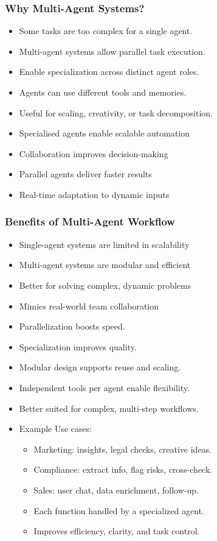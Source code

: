 \begin{frame}[fragile]\frametitle{Why Multi-Agent Systems?}
    \begin{itemize}
		\item Some tasks are too complex for a single agent.
		\item Multi-agent systems allow parallel task execution.
		\item Enable specialization across distinct agent roles.
		\item Agents can use different tools and memories.
		\item Useful for scaling, creativity, or task decomposition.	
        \item Specialised agents enable scalable automation
        \item Collaboration improves decision-making
        \item Parallel agents deliver faster results
        \item Real-time adaptation to dynamic inputs
    \end{itemize}
\end{frame}

\begin{frame}[fragile]\frametitle{Benefits of Multi-Agent Workflow}
    \begin{itemize}
        \item Single-agent systems are limited in scalability
        \item Multi-agent systems are modular and efficient
        \item Better for solving complex, dynamic problems
        \item Mimics real-world team collaboration
		\item Parallelization boosts speed.
		\item Specialization improves quality.
		\item Modular design supports reuse and scaling.
		\item Independent tools per agent enable flexibility.
		\item Better suited for complex, multi-step workflows.		
		\item Example Use cases:
		  \begin{itemize}
			\item Marketing: insights, legal checks, creative ideas.
			\item Compliance: extract info, flag risks, cross-check.
			\item Sales: user chat, data enrichment, follow-up.
			\item Each function handled by a specialized agent.
			\item Improves efficiency, clarity, and task control.
		  \end{itemize}
    \end{itemize}
\end{frame}

